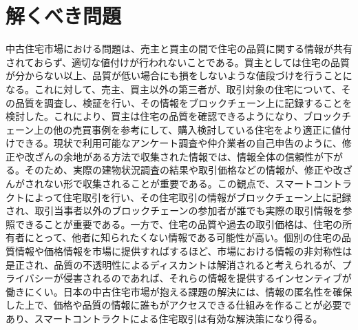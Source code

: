 \documentclass[a4paper,fontsize=11pt,report,notitlepage,line_length=38zw,number_of_lines=40,dvipdfmx]{jlreq}
\begin{document}
\section{解くべき問題}
中古住宅市場における問題は、売主と買主の間で住宅の品質に関する情報が共有されておらず、適切な値付けが行われないことである。買主としては住宅の品質が分からない以上、品質が低い場合にも損をしないような値段づけを行うことになる。これに対して、売主、買主以外の第三者が、取引対象の住宅について、その品質を調査し、検証を行い、その情報をブロックチェーン上に記録することを検討した。これにより、買主は住宅の品質を確認できるようになり、ブロックチェーン上の他の売買事例を参考にして、購入検討している住宅をより適正に値付けできる。現状で利用可能なアンケート調査や仲介業者の自己申告のように、修正や改ざんの余地がある方法で収集された情報では、情報全体の信頼性が下がる。そのため、実際の建物状況調査の結果や取引価格などの情報が、修正や改ざんがされない形で収集されることが重要である。この観点で、スマートコントラクトによって住宅取引を行い、その住宅取引の情報がブロックチェーン上に記録され、取引当事者以外のブロックチェーンの参加者が誰でも実際の取引情報を参照できることが重要である。一方で、住宅の品質や過去の取引価格は、住宅の所有者にとって、他者に知られたくない情報である可能性が高い。個別の住宅の品質情報や価格情報を市場に提供すればするほど、市場における情報の非対称性は是正され、品質の不透明性によるディスカントは解消されると考えられるが、プライバシーが侵害されるのであれば、それらの情報を提供するインセンティブが働きにくい。日本の中古住宅市場が抱える課題の解決には、情報の匿名性を確保した上で、価格や品質の情報に誰もがアクセスできる仕組みを作ることが必要であり、スマートコントラクトによる住宅取引は有効な解決策になり得る。
\end{document}
